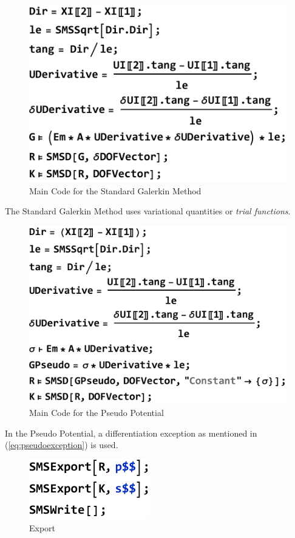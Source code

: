 \clearpage

\begin{figure}[htb]
	\includegraphics{figures/galerkincode}
	\caption{Main Code for the Standard Galerkin Method}
	\label{fig:galerkin}
\end{figure}

The Standard Galerkin Method uses variational quantities or \textit{trial functions}.

\begin{figure}[htb]
	\includegraphics{figures/pseudopotcode}
	\caption{Main Code for the Pseudo Potential}
	\label{fig:pseudo_potential}
\end{figure}

In the Pseudo Potential, a differentiation exception as mentioned in (\ref{eq:pseudoexception}) is used.

\begin{figure}[htb]
	\includegraphics{figures/acegen_input_4}
	\caption{Export}
	\label{fig:Export}
\end{figure}

